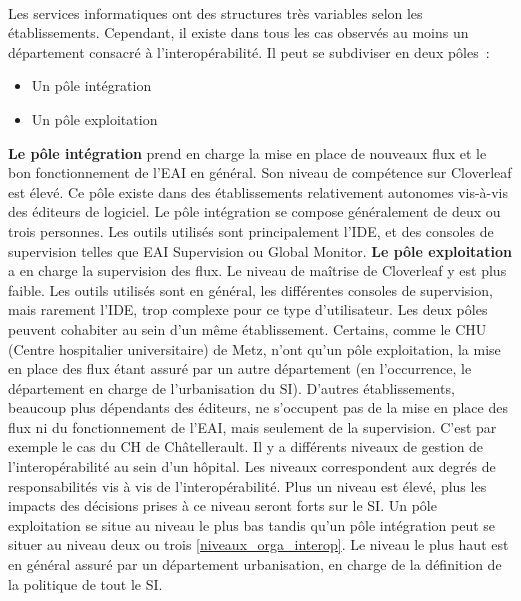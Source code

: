 			\paragraph{}%
			Les services informatiques ont des structures très variables selon les
			établissements. Cependant, il existe dans tous les cas observés au moins un
			département consacré à l’interopérabilité. Il peut se subdiviser
			en deux pôles~:
			\begin{itemize}
			  \item Un pôle intégration
			  \item Un pôle exploitation
			\end{itemize}
			\textbf{Le pôle intégration} prend en charge la mise en place de nouveaux
			flux et le bon fonctionnement de l’EAI en général. Son niveau de compétence
			sur Cloverleaf est élevé. Ce pôle existe dans des établissements
			relativement autonomes vis-à-vis des éditeurs de logiciel. Le pôle
			intégration se compose généralement de deux ou trois personnes. Les outils
			utilisés sont principalement l’IDE, et des consoles de supervision telles
			que EAI Supervision ou Global Monitor.\newline
			\textbf{Le pôle exploitation} a en charge la supervision des flux. Le niveau
			de maîtrise de Cloverleaf y est plus faible. Les outils utilisés sont en
			général, les différentes consoles de supervision,
			mais rarement l’IDE, trop complexe pour ce type d’utilisateur.\newline
			Les deux pôles peuvent cohabiter au sein d’un même établissement. Certains,
			comme le CHU (Centre hospitalier universitaire) de Metz, n’ont qu’un pôle
			exploitation, la mise en place des flux étant assuré par un autre département (en l’occurrence, le département
			en charge de l’urbanisation du SI). D’autres établissements, beaucoup plus
			dépendants des éditeurs, ne s’occupent pas de la mise en place des flux ni
			du fonctionnement de l’EAI, mais seulement de la supervision. C’est par
			exemple le cas du CH de Châtellerault.\newline
			Il y a différents niveaux de gestion de l’interopérabilité au sein d’un
			hôpital.
			Les niveaux correspondent aux degrés de responsabilités vis à vis de
			l'interopérabilité. Plus un niveau est élevé, plus les impacts des
			décisions prises à ce niveau seront forts sur le SI. Un pôle exploitation se
			situe au niveau le plus bas tandis qu’un pôle intégration peut se situer au
			niveau deux ou trois \ref{niveaux_orga_interop}. Le niveau le plus haut est
			en général assuré par un département urbanisation, en charge de la définition de la politique de tout
			le SI.
			
